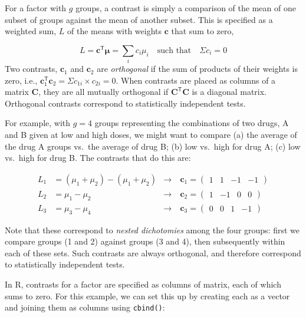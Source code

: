 \documentclass[
  letterpaper,
  10pt,
  krantz2]{krantz}
\begin{document}
For a factor with \(g\) groups, a contrast is simply a comparison of the
mean of one subset of groups against the mean of another subset. This is
specified as a weighted sum, \(L\) of the means with weights
\(\mathbf{c}\) that sum to zero,

\[
L = \mathbf{c}^\mathsf{T} \boldsymbol{\mu} = \sum_i c_i \mu_i \quad\text{such that}\quad \Sigma c_i = 0
\] Two contrasts, \(\mathbf{c}_1\) and \(\mathbf{c}_2\) are
\emph{orthogonal} if the sum of products of their weights is zero, i.e.,
\(\mathbf{c}_1^\mathsf{T} \mathbf{c}_2 = \Sigma c_{1i} \times c_{2i} = 0\).
When contrasts are placed as columns of a matrix \(\mathbf{C}\), they
are all mutually orthogonal if \(\mathbf{C}^\mathsf{T} \mathbf{C}\) is a
diagonal matrix. Orthogonal contrasts correspond to statistically
independent tests.

For example, with \(g=4\) groups representing the combinations of two
drugs, A and B given at low and high doses, we might want to compare (a)
the average of the drug A groups vs.~the average of drug B; (b) low
vs.~high for drug A; (c) low vs.~high for drug B. The contrasts that do
this are:

\begin{eqnarray*}
L_1 & = (\mu_1 + \mu_2) - (\mu_1 + \mu_2) & \rightarrow\: & \mathbf{c}_1 = 
    \begin{pmatrix} 
     1 &  1 & -1 & -1 
    \end{pmatrix} \\
L_2 & = \mu_1 - \mu_2                     & \rightarrow\: & \mathbf{c}_2 = 
    \begin{pmatrix} 
     1 &  -1 & 0 & 0 
    \end{pmatrix} \\
L_3 & = \mu_3 - \mu_4                     & \rightarrow\: & \mathbf{c}_3 = 
    \begin{pmatrix} 
     0 &  0 & 1 & -1 
    \end{pmatrix}
\end{eqnarray*}

Note that these correspond to \emph{nested dichotomies} among the four
groups: first we compare groups (1 and 2) against groups (3 and 4), then
subsequently within each of these sets. Such contrasts are always
orthogonal, and therefore correspond to statistically independent tests.

In R, contrasts for a factor are specified as columns of matrix, each of
which sums to zero. For this example, we can set this up by creating
each as a vector and joining them as columns using \texttt{cbind()}:
\end{document}
